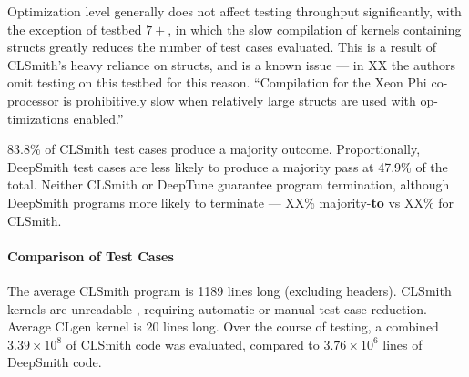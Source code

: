 Optimization level generally does not affect testing throughput significantly, with the exception of testbed $7+$, in which the slow compilation of kernels containing structs greatly reduces the number of test cases evaluated. This is a result of CLSmith's heavy reliance on structs, and is a known issue --- in XX the authors omit testing on this testbed for this reason. ``Compilation for the Xeon Phi co-processor is prohibitively slow when relatively large structs are used with op- timizations enabled.''

83.8\% of CLSmith test cases produce a majority \textbf{\cmark} outcome. Proportionally, DeepSmith test cases are less likely to produce a majority pass at 47.9\% of the total.  Neither CLSmith or DeepTune guarantee program termination, although DeepSmith programs more likely to terminate --- XX\% majority-\textbf{to} vs XX\% for CLSmith.


\paragraph{Comparison of Test Cases}
The average CLSmith program is 1189 lines long (excluding headers). CLSmith kernels are unreadable , requiring automatic or manual test case reduction.
Average CLgen kernel is 20 lines long.
Over the course of testing, a combined $3.39 \times 10^8$ of CLSmith code was evaluated, compared to $3.76 \times 10^6$ lines of DeepSmith code.


